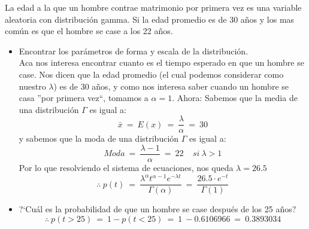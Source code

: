 %
%

La edad a la que un hombre contrae matrimonio por primera vez es una variable aleatoria con distribuci\'on gamma.
Si la edad promedio es de 30 a\~nos y los mas com\'un es que el hombre se case a los 22 a\~nos.
\begin{itemize}
	\item Encontrar los par\'ametros de forma y escala de la distribuci\'on.\\

	Aca nos interesa encontrar cuanto es el tiempo esperado en que un hombre se case.
	Nos dicen que la edad promedio (el cual podemos considerar como nuestro $\lambda$) es de 30 a\~nos,
	y como nos interesa saber cuando un hombre se casa ''por primera vez``, tomamos a $\alpha = 1$. Ahora:
	Sabemos que la media de una distribuci\'on $\Gamma$ es igual a:
	$$\bar{x}\ =\ E(x)\ =\ \frac{\lambda}{\alpha}\ =\ 30$$
	y sabemos que la moda de una distribuci\'on $\Gamma$ es igual a:
	$$Moda\ =\ \frac{\lambda-1}{\alpha}\ =\ 22\ \ \ \ \ si\ \lambda>1$$
	Por lo que resolviendo el sistema de ecuaciones, nos queda $\lambda = 26.5$\\
	
	$$\therefore\ p(t)\ =\ \frac{\lambda^{\alpha}t^{\alpha-1}e^{-\lambda t}}{\Gamma(\alpha)}\ =\ \frac{26.5\cdot e^{-t}}{\Gamma(1)} $$
	
	\item ?`Cu\'al es la probabilidad de que un hombre se case despu\'es de los 25 a\~nos?\\
	$$\therefore\ p(t>25)\ =\ 1-p(t<25)\ =\ 1\ -0.6106966\ =\ 0.3893034$$


\end{itemize}
